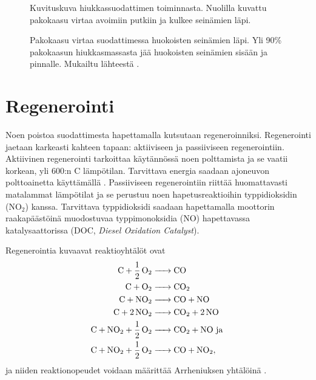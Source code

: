 \begin{figure}[H]
    \centering 
               {Kuvituskuva hiukkassuodattimen toiminnasta. Nuolilla kuvattu pakokaasu virtaa avoimiin putkiin ja kulkee seinämien läpi.}
    \caption{Pakokaasu virtaa suodattimessa huokoisten seinämien läpi. Yli 90\% pakokaasun hiukkasmassasta jää huokoisten seinämien sisään ja pinnalle. Mukailtu lähteestä \cite{dieselnet_dpf}.}
    \label{fig:wall-flow-dpf}
\end{figure}




\section{Regenerointi}
Noen poistoa suodattimesta hapettamalla kutsutaan regeneroinniksi. Regenerointi jaetaan karkeasti kahteen tapaan: aktiiviseen ja passiiviseen regenerointiin. 
Aktiivinen regenerointi tarkoittaa käytännössä noen polttamista ja se
vaatii korkean, yli 600:n \degree C lämpötilan. Tarvittava energia saadaan ajoneuvon polttoainetta käyttämällä \cite{dieselnet_dpf}. Passiiviseen regenerointiin riittää huomattavasti matalammat lämpötilat ja se perustuu noen hapetusreaktioihin typpidioksidin (NO\(_2\)) kanssa. Tarvittava typpidioksidi saadaan hapettamalla moottorin raakapäästöinä muodostuvaa typpimonoksidia (NO) hapettavassa katalysaattorissa (DOC, \emph{Diesel Oxidation Catalyst}).


Regenerointia kuvaavat reaktioyhtälöt ovat  
\begin{align}
    \ce{C + 1/2 O2 &-> CO }\label{req:regen_c2co}\\
    \ce{C + O2 &-> CO2}\label{req:regen_c2co2}\\
    \ce{C + NO2 &-> CO +  NO}  \\
    \ce{C + 2 NO2 &-> CO2 + 2 NO}  \\
    \ce{C + NO2 + 1/2 O2 &-> CO2 + NO} \text{ ja }\\
    \ce{C + NO2 + 1/2 O2 &-> CO + NO2},
\end{align}
ja niiden reaktionopeudet voidaan määrittää Arrheniuksen yhtälöinä \cite{LiuGuanlin2021Roio}.

